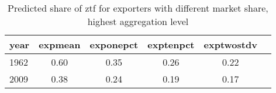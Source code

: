 \begin{table}[htbp]
\caption{\label{clabel} Predicted share of ztf for exporters with different market share, highest aggregation level}\centering\medskip
\begin{tabular}{|l|c|c|c|c|c|}\hline  
 \multicolumn{1}{c}{ year }  & expmean  & exponepct  & exptenpct  & exptwostdv  \\ \hline  
     1962 &      0.60 &      0.35 &      0.26 &      0.22 \\ \hline 
     2009 &      0.38 &      0.24 &      0.19 &      0.17 \\ \hline 
  \end{tabular}
\end{table}
